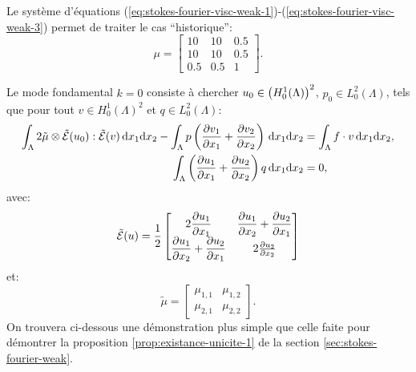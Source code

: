 \begin{remarque}
Le système d'équations
(\ref{eq:stokes-fourier-visc-weak-1})-(\ref{eq:stokes-fourier-visc-weak-3})
permet de traiter le cas ``historique'':
\begin{equation}
  \mu = \begin{bmatrix}
    10 & 10 & 0.5\\
    10 & 10 & 0.5\\
    0.5 & 0.5 & 1
  \end{bmatrix}.
\end{equation}
\end{remarque}

\begin{remarque}
  Le mode fondamental $k = 0$ consiste à chercher  $u_0\in\left( H_0^1(\Lambda) \right)^2$, $p_0\in L_0^2(\Lambda)$, tels que
pour tout $v\in H_0^1(\Lambda)^2$ et $q\in L_0^2(\Lambda)$:
\begin{align}
  \int_\Lambda 2\tilde\mu\otimes \tilde \straintensor(u_0):\tilde \straintensor(v)\,\mathrm dx_1\mathrm dx_2 %
  - \int_\Lambda p\parent{\frac{\partial v_1}{\partial x_1} %
                          + \frac{\partial v_2}{\partial x_2}}\,\mathrm dx_1\mathrm dx_2 %
  &= \int_\Lambda f\cdot v\,\mathrm dx_1\mathrm dx_2,\\
  \int_\Lambda \parent{\frac{\partial u_1}{\partial x_1} %
    + \frac{\partial u_2}{\partial x_2}}q \,\mathrm dx_1\mathrm dx_2 %
  &= 0,
\end{align}
avec:
\begin{equation}\label{eq:stokes-fourier-strain-tensor-2d}
  \tilde \straintensor(u) = \frac{1}{2}\begin{bmatrix}
    2 \displaystyle\frac{\partial u_1}{\partial x_1} %
    & \displaystyle\frac{\partial u_1}{\partial x_2} + \displaystyle\frac{\partial u_2}{\partial x_1}\\
    \displaystyle\frac{\partial u_1}{\partial x_2} + \displaystyle\frac{\partial u_2}{\partial x_1} %
    & 2 \frac{\partial u_2}{\partial x_2}
  \end{bmatrix}
\end{equation}
et:
\begin{equation}\label{eq:stokes-fourier-visc-tensor-2d}
\tilde \mu = \begin{bmatrix}
  \mu_{1,1} & \mu_{1,2}\\
  \mu_{2,1} & \mu_{2,2}
\end{bmatrix}.
\end{equation}
On trouvera ci-dessous une démonstration plus simple que celle faite
pour démontrer la proposition \ref{prop:existance-unicite-1} de la
section \ref{sec:stokes-fourier-weak}.
\end{remarque}

